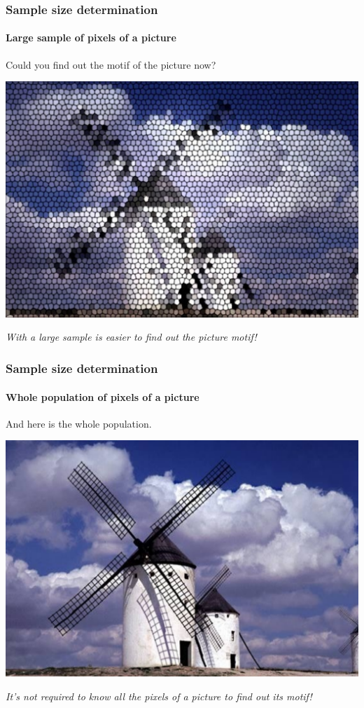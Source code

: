 \begin{frame}
\frametitle{Sample size determination}
\framesubtitle{Large sample of pixels of a picture}
Could you find out the motif of the picture now?
\begin{center}
\includegraphics[scale=0.45]{img/introduction/sample_windmill2.pdf}

\emph{With a large sample is easier to find out the picture motif!}
\end{center}
\end{frame}


\begin{frame}
\frametitle{Sample size determination}
\framesubtitle{Whole population of pixels of a picture}
And here is the whole population.
\begin{center}
\includegraphics[scale=0.45]{img/introduction/sample_windmill3.pdf}

\emph{It’s not required to know all the pixels of a picture to find out its motif!}
\end{center}
\end{frame}


